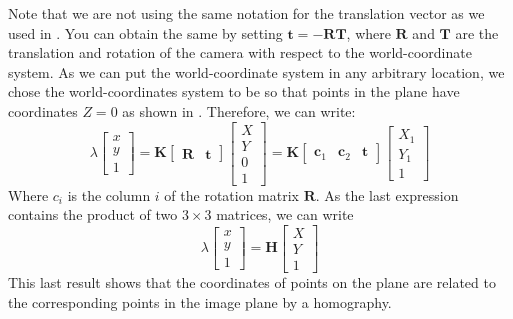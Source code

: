 Note that we are not using the same notation for the translation vector as we used in \eqn{\ref{eq:extrinsic}}. You can obtain the same by setting $\mathbf{t}= -\mathbf{R} \mathbf{T}$, where $ \mathbf{R}$ and $\mathbf{T}$ are the translation and rotation of the camera with respect to the world-coordinate system. As we can put the world-coordinate system in any arbitrary location, we chose the world-coordinates system to be so that points in the plane have coordinates $Z=0$ as shown in \fig{\ref{fig:homography_plane_geometry}}. Therefore, we can write:
\begin{equation}
    \lambda
    \begin{bmatrix}
        x \\
        y \\
        1
    \end{bmatrix}
    =
    \mathbf{K}
    \begin{bmatrix}
        \mathbf{R} & \mathbf{t}
    \end{bmatrix}
    \begin{bmatrix}
        X \\
        Y \\
        0 \\
        1
    \end{bmatrix}
    =
    \mathbf{K}
    \begin{bmatrix}
        \mathbf{c}_1 & \mathbf{c}_2 & \mathbf{t}
    \end{bmatrix}
    \begin{bmatrix}
        X_1 \\
        Y_1 \\
        1
    \end{bmatrix}
\end{equation}
Where $c_i$ is the column $i$ of the rotation matrix $\mathbf{R}$. As the last expression contains the product of two $3 \times 3$ matrices, we can write
\begin{equation}
    \lambda
    \begin{bmatrix}
        x \\
        y \\
        1
    \end{bmatrix}
    =
    \mathbf{H}
    \begin{bmatrix}
        X \\
        Y \\
        1
    \end{bmatrix}
    \label{eq:projectionintofirstcamera}
\end{equation}
This last result shows that the coordinates of points on the plane are related to the corresponding points in the image plane by a homography.

